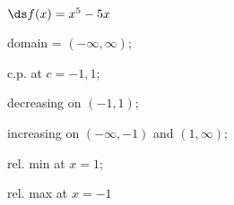 {$\ds f(x) =x^5-5x$
}
{domain = $(-\infty,\infty)$;

c.p. at $c=-1,1$;

decreasing on $(-1,1)$;

increasing on $(-\infty,-1)$ and $(1,\infty)$;

rel. min at $x=1$;

rel. max at $x=-1$
}
